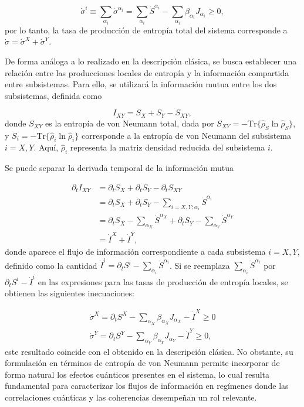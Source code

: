 \begin{equation*}
    \dot{\sigma}^{i} \equiv \sum_{\alpha_{i}} \dot{\sigma}^{\alpha_{i}} = \sum_{\alpha_{i}} \dot{S}^{\alpha_{i}} - \sum_{\alpha_{i}} \beta_{\alpha_{i}} J_{\alpha_{i}} \geq 0,
\end{equation*}
por lo tanto, la tasa de producción de entropía total del sistema corresponde a $\dot{\sigma} = \dot{\sigma}^{X} + \dot{\sigma}^{Y}$. 

De forma análoga a lo realizado en la descripción clásica, se busca establecer una relación entre las producciones locales de entropía y la información compartida entre subsistemas. Para ello, se utilizará la información mutua entre los dos subsistemas, definida como
 
\begin{equation*}
    I_{XY} = S_{X} + S_{Y} - S_{XY},
\end{equation*}
donde $S_{XY}$ es la entropía de von Neumann total, dada por $S_{XY} = -\mathrm{Tr}\{ \hat{\rho}_{S} \ln \hat{\rho}_{S} \}$, y $S_{i} = - \mathrm{Tr}\{ \hat{\rho}_{i} \ln \hat{\rho}_{i} \}$ corresponde a la entropía de von Neumann del subsistema $i = X, Y$. Aquí, $\hat{\rho}_{i}$ representa la matriz densidad reducida del subsistema $i$.

Se puede separar la derivada temporal de la información mutua

\begin{align*}
    \partial_{t}I_{XY} & = \partial_{t}S_{X} + \partial_{t}S_{Y} - \partial_{t}S_{XY} \\
        & = \partial_{t}S_{X} + \partial_{t}S_{Y} - \sum_{i=X,Y;\alpha_{i}}\dot{S}^{\alpha_{i}} \\
        & =  \partial_{t}S_{X} - \sum_{\alpha_{X}} \dot{S}^{\alpha_{X}} + \partial_{t}S_{Y} - \sum_{\alpha_{Y}} \dot{S}^{\alpha_{Y}} \\
        & = \dot{I}^{X} + \dot{I}^{Y},
\end{align*}
donde aparece el flujo de información correspondiente a cada subsistema $i = X, Y$, definido como la cantidad $\dot{I}^{i} = \partial_{t} S^{i} - \sum_{\alpha_{i}} \dot{S}^{\alpha_{i}}$. Si se reemplaza $\sum_{\alpha_{i}} \dot{S}^{\alpha_{i}}$ por $\partial_{t} S^{i} - \dot{I}^{i}$ en las expresiones para las tasas de producción de entropía locales, se obtienen las siguientes inecuaciones:

\begin{align}
    \dot{\sigma}^{X} = \partial_{t}S^{X} - \sum_{\alpha_{X}} \beta_{\alpha_{X}} J_{\alpha_{X}} - \dot{I}^{X} \geq 0 \\
    \dot{\sigma}^{Y} = \partial_{t}S^{Y} - \sum_{\alpha_{Y}} \beta_{\alpha_{Y}} J_{\alpha_{Y}} - \dot{I}^{Y} \geq 0,
    \label{sec4:localentropyquantum}
\end{align}
este resultado coincide con el obtenido en la descripción clásica. No obstante, su formulación en términos de entropía de von Neumann permite incorporar de forma natural los efectos cuánticos presentes en el sistema, lo cual resulta fundamental para caracterizar los flujos de información en regímenes donde las correlaciones cuánticas y las coherencias desempeñan un rol relevante.

